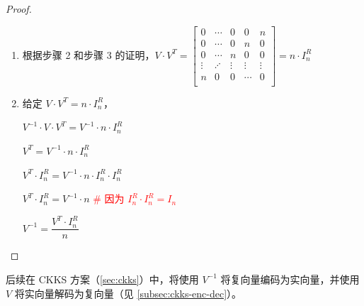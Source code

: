 \begin{proof}
\begin{enumerate}
$\sum\limits_{k=0}^{n-1} \omega^{2k} = \sum\limits_{k=0}^{n-1} \omega^{4k} = \sum\limits_{k=0}^{n-1} \omega^{6k} = \cdots = \sum\limits_{k=0}^{n-1} \omega^{2(n-1)k} = \sum\limits_{k=0}^{n-1} \omega^{2(n+1)k} = \cdots = \sum\limits_{k=0}^{n-1} \omega^{2(2n-1)k} = 0$

$ $

\item 根据步骤 2 和步骤 3 的证明，$V \cdot V^T = 
\begin{bmatrix}
0 & \cdots & 0 & 0 & n\\
0 & \cdots & 0 & n & 0\\
0 & \cdots & n & 0 & 0\\
\vdots & \iddots & \vdots & \vdots & \vdots \\
n & 0 & 0 & \cdots & 0\\
\end{bmatrix} = n \cdot I_n^R$

\item 给定 $V \cdot V^T = n \cdot I_n^R$，

$V^{-1} \cdot V \cdot V^T = V^{-1} \cdot n \cdot I_n^R$

$V^T = V^{-1} \cdot n \cdot I_n^R$

$V^T \cdot I_n^R = V^{-1} \cdot n \cdot I_n^R  \cdot I_n^R$

$V^T \cdot I_n^R = V^{-1} \cdot n$ \textcolor{red}{\text{ } \# 因为 $I_n^R  \cdot I_n^R = I_n$}

$V^{-1} = \dfrac{V^T \cdot I_n^R}{n}$

\end{enumerate}
\end{proof}

后续在 CKKS 方案（\autoref{sec:ckks}）中，将使用 $V^{-1}$ 将复向量编码为实向量，并使用 $V$ 将实向量解码为复向量（见 \autoref{subsec:ckks-enc-dec}）。

$ $




